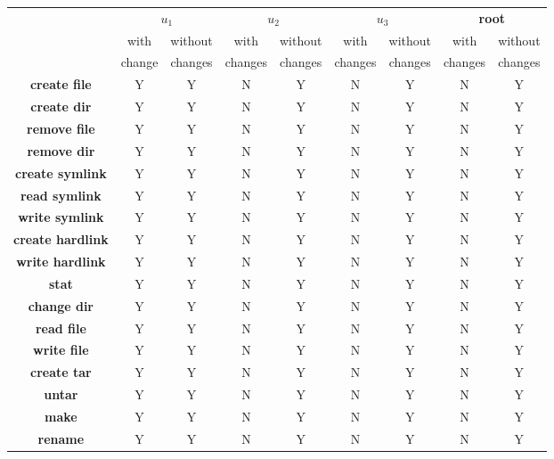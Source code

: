 \begin{table*}[th]
\small
\centering

\begin{tabular}{ c|c|c|c|c|c|c|c|c| }
  \cline{2-9}
  & 
  \multicolumn{2}{c}{\textbf{$u_{1}$}} &
  \multicolumn{2}{|c}{\textbf{$u_{2}$}} &
  \multicolumn{2}{|c}{\textbf{$u_{3}$}} &
  \multicolumn{2}{|c|}{\textbf{root}}  \\
  \cline{2-9}
  \multicolumn{1}{c|}{} &
  with & without & with & without & with & without & with & without\\
  \multicolumn{1}{c|}{} &
  change & changes & changes & changes & changes & changes & changes &
  changes\\
  \hline
  \multicolumn{1}{|c|}{\textbf{create file}}
  & Y & Y & N & Y & N & Y & N & Y \\
  \hline
  \multicolumn{1}{|c|}{\textbf{create dir}}
  & Y & Y & N & Y & N & Y & N & Y \\
  \hline
  \multicolumn{1}{|c|}{\textbf{remove file}}
  & Y & Y & N & Y & N & Y & N & Y \\
  \hline
  \multicolumn{1}{|c|}{\textbf{remove dir}}
  & Y & Y & N & Y & N & Y & N & Y \\
  \hline
  \multicolumn{1}{|c|}{\textbf{create symlink}}
  & Y & Y & N & Y & N & Y & N & Y \\
  \hline
  \multicolumn{1}{|c|}{\textbf{read symlink}}
  & Y & Y & N & Y & N & Y & N & Y \\
  \hline
  \multicolumn{1}{|c|}{\textbf{write symlink}}
  & Y & Y & N & Y & N & Y & N & Y \\
  \hline
  \multicolumn{1}{|c|}{\textbf{create hardlink}}
  & Y & Y & N & Y & N & Y & N & Y \\
  \hline
  \multicolumn{1}{|c|}{\textbf{write hardlink}}
  & Y & Y & N & Y & N & Y & N & Y \\
  \hline
  \multicolumn{1}{|c|}{\textbf{stat}}
  & Y & Y & N & Y & N & Y & N & Y \\
  \hline
  \multicolumn{1}{|c|}{\textbf{change dir}}
  & Y & Y & N & Y & N & Y & N & Y \\
  \hline
  \multicolumn{1}{|c|}{\textbf{read file}}
  & Y & Y & N & Y & N & Y & N & Y \\
  \hline
  \multicolumn{1}{|c|}{\textbf{write file}}
  & Y & Y & N & Y & N & Y & N & Y \\
  \hline
  \multicolumn{1}{|c|}{\textbf{create tar}}
  & Y & Y & N & Y & N & Y & N & Y \\
  \hline
  \multicolumn{1}{|c|}{\textbf{untar}}
  & Y & Y & N & Y & N & Y & N & Y \\
  \hline
  \multicolumn{1}{|c|}{\textbf{make}}
  & Y & Y & N & Y & N & Y & N & Y \\
  \hline
  \multicolumn{1}{|c|}{\textbf{rename}}
  & Y & Y & N & Y & N & Y & N & Y \\
  \hline
\end{tabular}


\end{table*}
